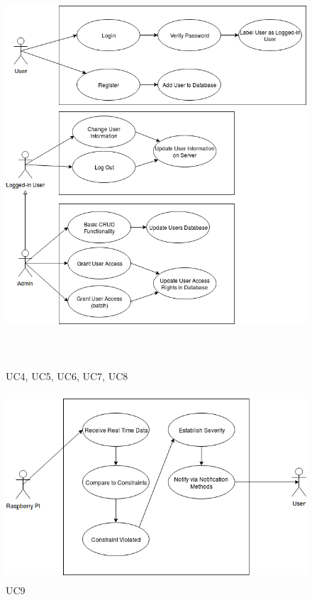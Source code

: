 \pagebreak

\begin{figure}[!htb]
	\includegraphics[width=15cm, height=15cm]{Diagrams/UseCase45678.png}
	\caption{UC4, UC5, UC6, UC7, UC8}
\end{figure}

\pagebreak

\begin{figure}[!htb]
	\includegraphics[width=15cm, height=7cm]{Diagrams/UseCase4.png}
	\caption{UC9}
\end{figure}

